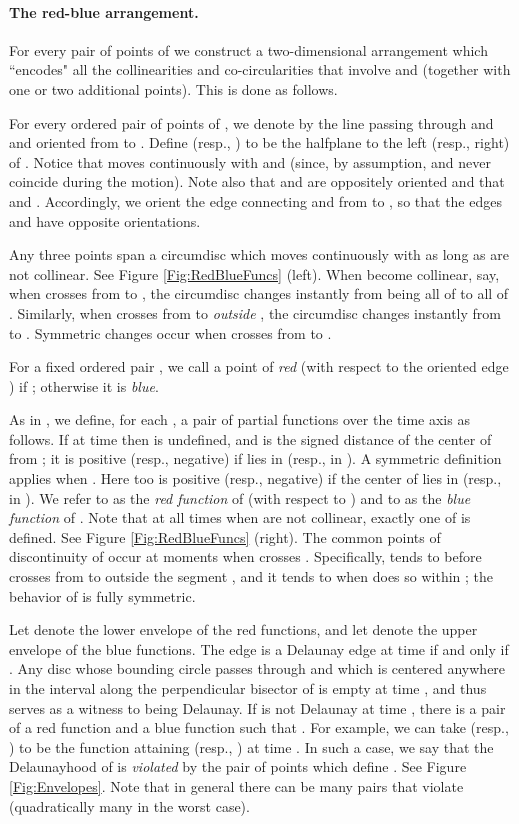 \documentclass[letter,11pt]{article}
\begin{document}
\paragraph{The red-blue arrangement.} For every pair of points  of  we construct a two-dimensional arrangement which ``encodes" all the collinearities and co-circularities that involve  and  (together with one or two additional points). This is done as follows.

For every ordered pair  of points of , we
denote by  the line passing through  and  and oriented from  to . 
Define  (resp., ) to be the halfplane to the left (resp., right) of .
Notice that  moves continuously with  and  (since, by assumption,  and  never coincide during the motion). Note also that  and  are oppositely oriented and that  and .
Accordingly, we orient the edge  connecting  and  from  to , so that the edges  and  have opposite orientations.


Any three points  span a circumdisc  which moves continuously with  as long as  are not collinear. See Figure \ref{Fig:RedBlueFuncs} (left). When  become collinear, say, when  crosses  from  to , the circumdisc  changes instantly from being all of  to all of .
Similarly, when  crosses  from  to  {\it outside} , the circumdisc changes instantly from  to . Symmetric changes occur when  crosses  from  to .

 
For a fixed ordered pair , we call a point  of  {\it red} (with respect to the oriented edge ) if ; otherwise it is {\it blue}.

As in \cite{gmr-vdmpp-92}, we define, for each , a pair of partial functions  over the time axis as follows.
If  at time  then  is undefined, and  is the signed distance of the center  of  from ; it is positive (resp., negative) if  lies in  (resp., in ). A symmetric definition applies when . Here too  is positive (resp., negative) if the center of  lies in  (resp., in ). We refer to  as the {\it red function} of  (with respect to ) and to  as the {\it blue function} of . Note that at all times when  are not collinear, exactly one of  is defined. See Figure \ref{Fig:RedBlueFuncs} (right).
The common points of discontinuity of  occur at moments when  crosses . Specifically,  tends to  before  crosses  from  to  outside the segment , and it tends to  when  does so within ; the behavior of  is fully symmetric. 




Let  denote the lower envelope of the red functions, and let  denote the upper envelope of the blue functions. The edge  is a Delaunay edge at time  if and only if . Any disc whose bounding circle passes through  and  which is centered anywhere in the interval  along the perpendicular bisector of  is empty at time , and thus serves as a witness to  being Delaunay.
If  is not Delaunay at time , there is a pair of a red function  and a blue function  such that .
For example, we can take  (resp., ) to be the function attaining  (resp., ) at time . In such a case, we say that the Delaunayhood of  is {\it violated} by the pair of points  which define . See Figure \ref{Fig:Envelopes}. Note that in general there can be many pairs  that violate  (quadratically many in the worst case).
\end{document}
